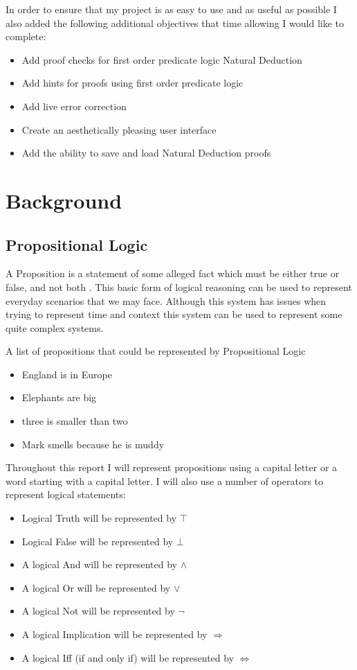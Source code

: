 In order to ensure that my project is as easy to use and as useful as possible I also added the following additional objectives that time allowing I would like to complete:
\begin{itemize}
\item Add proof checks for first order predicate logic Natural Deduction
\item Add hints for proofs using first order predicate logic
\item Add live error correction 
\item Create an aesthetically pleasing user interface
\item Add the ability to save and load Natural Deduction proofs
\end{itemize}

\section{Background}

\subsection{Propositional Logic}

A Proposition is a statement of some alleged fact which must be either true or false, and not both \cite{ndBook}. This basic form of logical reasoning can be used to represent everyday scenarios that we may face. Although this system has issues when trying to represent time and context this system can be used to represent some quite complex systems.

\begin{exmp}A list of propositions that could be represented by Propositional Logic
\begin{itemize}
\item England is in Europe
\item Elephants are big
\item three is smaller than two
\item Mark smells because he is muddy
\end{itemize}
\end{exmp}

Throughout this report I will represent propositions using a capital letter or a word starting with a capital letter. I will also use a number of operators to represent logical statements:
\begin{itemize}
\item Logical Truth will be represented by $\top$
\item Logical False will be represented by $\bot$
\item A logical And will be represented by $\wedge$
\item A logical Or will be represented by $\vee$
\item A logical Not will be represented by $\neg$
\item A logical Implication will be represented by $\Rightarrow$
\item A logical Iff (if and only if) will be represented by $\Leftrightarrow$
\end{itemize}


